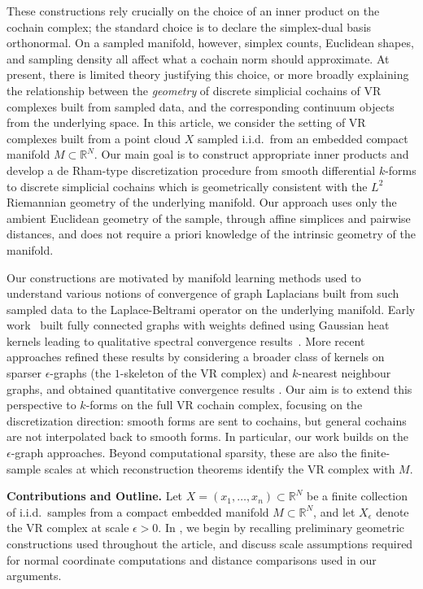 \documentclass[11pt,reqno]{amsproc}
\numberwithin{equation}{section}
\newcommand{\R}{\mathbb{R}}
\theoremstyle{definition}
\theoremstyle{plain}
\begin{document}
These constructions rely crucially on the choice of an inner product on the cochain complex; the standard choice is to declare the simplex-dual basis orthonormal. On a sampled manifold, however, simplex counts, Euclidean shapes, and sampling density all affect what a cochain norm should approximate. At present, there is limited theory justifying this choice, or more broadly explaining the relationship between the \emph{geometry} of discrete simplicial cochains of VR complexes built from sampled data, and the corresponding continuum objects from the underlying space. In this article, we consider the setting of VR complexes built from a point cloud $X$ sampled i.i.d.~from an embedded compact manifold $M \subset \R^N$. Our main goal is to construct appropriate inner products and develop a de Rham-type discretization procedure from smooth differential $k$-forms to discrete simplicial cochains which is geometrically consistent with the $L^2$ Riemannian geometry of the underlying manifold. Our approach uses only the ambient Euclidean geometry of the sample, through affine simplices and pairwise distances, and does not require a priori knowledge of the intrinsic geometry of the manifold. 


Our constructions are motivated by manifold learning methods used to understand various notions of convergence of graph Laplacians built from such sampled data to the Laplace-Beltrami operator on the underlying manifold. Early work~\cite{belkin_towards_2008,coifman_diffusion_2006} built fully connected graphs with weights defined using Gaussian heat kernels leading to qualitative spectral convergence results~\cite{belkin_convergence_2006}. More recent approaches refined these results by considering a broader class of kernels on sparser $\epsilon$-graphs (the $1$-skeleton of the VR complex) and $k$-nearest neighbour graphs, and obtained quantitative convergence results \cite{garcia_trillos_error_2020,calder_improved_2022}. 
Our aim is to extend this perspective to $k$-forms on the full VR cochain complex, focusing on the discretization direction: smooth forms are sent to cochains, but general cochains are not interpolated back to smooth forms. In particular, our work builds on the $\epsilon$-graph approaches. Beyond computational sparsity, these are also the finite-sample scales at which reconstruction theorems identify the VR complex with $M$. \medskip



\textbf{Contributions and Outline.} Let $X = (x_1, \ldots, x_n) \subset \R^N$ be a finite collection of i.i.d.~samples from a compact embedded manifold $M \subset \R^N$, and let $X_\epsilon$ denote the VR complex at scale $\epsilon>0$. In , we begin by recalling preliminary geometric constructions used throughout the article, and discuss scale assumptions required for normal coordinate computations and distance comparisons used in our arguments. 
\end{document}
